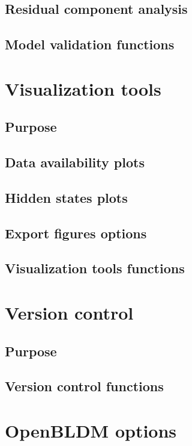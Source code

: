 \documentclass{book}
\begin{document}
\section{Residual component analysis}
\section{Model validation functions}
\newpage

\chapter{Visualization tools}
\section{Purpose}
\section{Data availability plots}
\section{Hidden states plots}
\section{Export figures options}
\section{Visualization tools functions}
\newpage


\chapter{Version control}
\section{Purpose}
\section{Version control functions}
\newpage

\chapter{OpenBLDM options}
\end{document}
